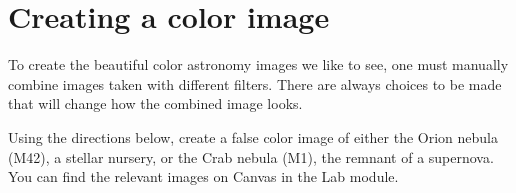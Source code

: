 
\section{Creating a color image}

To create the beautiful color astronomy images we like to see, one must
manually combine images taken with different filters. There are always choices
to be made that will change how the combined image looks.

\begin{steps}
	\item\label{ic:step:color-image} Using the directions below, create a
false color image of either the Orion nebula (M42), a stellar nursery, or the
Crab nebula (M1), the remnant of a supernova. You can find the relevant images
on Canvas in the Lab module.  \end{steps}

